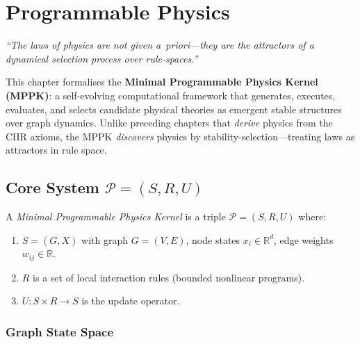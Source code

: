 \chapter{Programmable Physics}
\label{ch:programmable-physics}

\begin{center}
\textit{%
``The laws of physics are not given \emph{a~priori}---they are the
attractors of a dynamical selection process over rule-spaces.''
}
\end{center}

\medskip\noindent
This chapter formalises the \textbf{Minimal Programmable Physics Kernel
(MPPK)}: a self-evolving computational framework that generates, executes,
evaluates, and selects candidate physical theories as emergent stable
structures over graph dynamics.  Unlike preceding chapters that \emph{derive}
physics from the CIIR axioms, the MPPK \emph{discovers} physics by
stability-selection---treating laws as attractors in rule space.

\section{Core System \texorpdfstring{$\mathcal{P}=(S,R,U)$}{P=(S,R,U)}}
\label{sec:mppk-core}

\begin{definition}\label{def:mppk}
A \emph{Minimal Programmable Physics Kernel} is a triple
$\mathcal{P} = (S,R,U)$ where:
\begin{enumerate}[nosep]
  \item $S = (G,X)$ with graph $G=(V,E)$, node states
        $x_i\in\mathbb{R}^d$, edge weights $w_{ij}\in\mathbb{R}$.
  \item $R$ is a set of local interaction rules (bounded nonlinear
        programs).
  \item $U\colon S\times R\to S$ is the update operator.
\end{enumerate}
\end{definition}

\subsection{Graph State Space}


